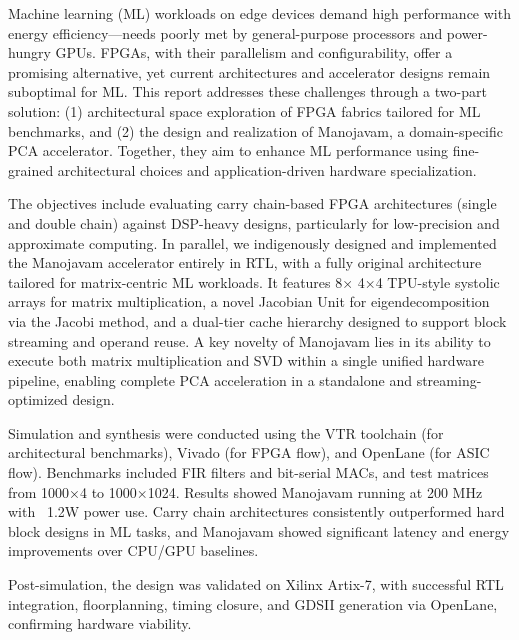 \vspace{-1cm}

Machine learning (ML) workloads on edge devices demand high performance with energy efficiency—needs poorly met by general-purpose processors and power-hungry GPUs. FPGAs, with their parallelism and configurability, offer a promising alternative, yet current architectures and accelerator designs remain suboptimal for ML. This report addresses these challenges through a two-part solution: (1) architectural space exploration of FPGA fabrics tailored for ML benchmarks, and (2) the design and realization of Manojavam, a domain-specific PCA accelerator. Together, they aim to enhance ML performance using fine-grained architectural choices and application-driven hardware specialization.

The objectives include evaluating carry chain-based FPGA architectures (single and double chain) against DSP-heavy designs, particularly for low-precision and approximate computing. In parallel, we indigenously designed and implemented the Manojavam accelerator entirely in RTL, with a fully original architecture tailored for matrix-centric ML workloads. It features 8× 4×4 TPU-style systolic arrays for matrix multiplication, a novel Jacobian Unit for eigendecomposition via the Jacobi method, and a dual-tier cache hierarchy designed to support block streaming and operand reuse. A key novelty of Manojavam lies in its ability to execute both matrix multiplication and SVD within a single unified hardware pipeline, enabling complete PCA acceleration in a standalone and streaming-optimized design.

Simulation and synthesis were conducted using the VTR toolchain (for architectural benchmarks), Vivado (for FPGA flow), and OpenLane (for ASIC flow). Benchmarks included FIR filters and bit-serial MACs, and test matrices from 1000×4 to 1000×1024. Results showed Manojavam running at 200 MHz with ~1.2W power use. Carry chain architectures consistently outperformed hard block designs in ML tasks, and Manojavam showed significant latency and energy improvements over CPU/GPU baselines.

Post-simulation, the design was validated on Xilinx Artix-7, with successful RTL integration, floorplanning, timing closure, and GDSII generation via OpenLane, confirming hardware viability.

